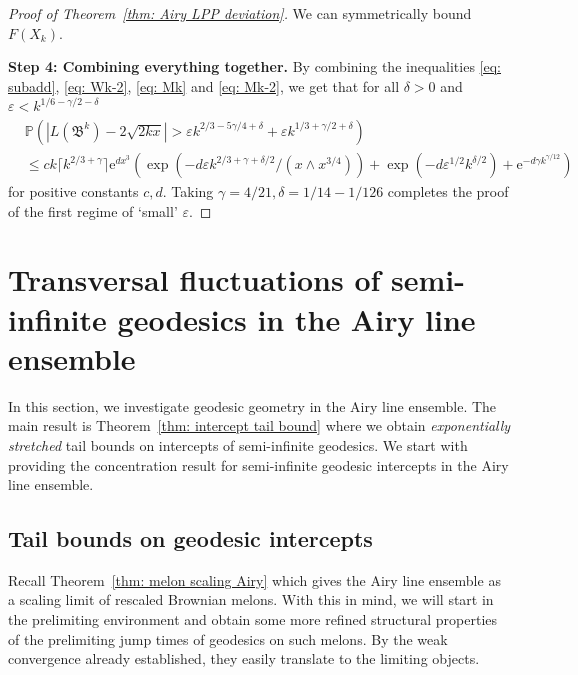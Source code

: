 \documentclass[11pt, reqno]{amsart}
\numberwithin{equation}{section}
\newcommand{\PP}{\ensuremath{\mathbb{P}}}
\newcommand{\ceil}[1]{\lceil #1 \rceil}
\begin{document}
\begin{proof}[Proof of Theorem~\ref{thm: Airy LPP deviation}]
We can symmetrically bound $F(X_k)$.

\medskip

\noindent \textbf{Step 4: Combining everything together.}
By combining the inequalities \eqref{eq: subadd}, \eqref{eq: Wk-2}, \eqref{eq: Mk} and \eqref{eq: Mk-2}, we get that for all $\delta >0 $ and $\varepsilon < k ^{1/6-\gamma/2 - \delta}$
\begin{align*}
&\PP\left( |L(\mathfrak{B}^k) - 2\sqrt{2kx}| >  \varepsilon k^{2/3 - 5\gamma/4 + \delta} + \varepsilon k^{1/3 + \gamma /2 + \delta} \right)\\
& \le c k\ceil{k^{2/3+\gamma}} \mathrm{e}^{dx^3}\left(\exp \left(-d \varepsilon k^{2/3+\gamma + \delta/2}/(x\land x^{3/4})\right)+\exp(-d\varepsilon^{1/2}  k^{\delta/2}) + \mathrm{e}^{-d\gamma k^{\gamma/12}}\right)
\end{align*}
for positive constants $c,d$. Taking $\gamma = 4/21, \delta = 1/14-1/126$ completes the proof of the first regime of `small' $\varepsilon$. 
\end{proof}

\section{Transversal fluctuations of semi-infinite geodesics in the  Airy line ensemble}\label{sec: geod geom}

In this section, we investigate geodesic geometry in the Airy line ensemble. The main result is Theorem~\ref{thm: intercept tail bound} where we obtain \emph{exponentially stretched} tail bounds on intercepts of semi-infinite geodesics. We start with providing the concentration result for semi-infinite geodesic intercepts in the Airy line ensemble.

\subsection{Tail bounds on geodesic intercepts} Recall Theorem~\ref{thm: melon scaling Airy} which gives the Airy line ensemble as a scaling limit of rescaled Brownian melons. With this in mind, we will start in the prelimiting environment and obtain some more refined structural properties of the prelimiting jump times of geodesics on such melons. By the weak convergence already established, they easily translate to the limiting objects.
    
\end{document}
